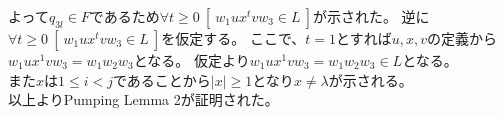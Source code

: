\documentclass[uplatex,dvipdfmx,a4paper,10pt]{jsarticle}
\begin{document}
        よって\(q_{3l} \in F\)であるため\(\forall t \geq 0\ [\ w_1ux^tvw_3 \in L\ ]\)が示された。
        逆に\(\forall t \geq 0\ [\ w_1ux^tvw_3 \in L\ ]\)を仮定する。
        ここで、\(t = 1\)とすれば\(u, x, v\)の定義から\(w_1ux^1vw_3 = w_1w_2w_3\)となる。
        仮定より\(w_1ux^1vw_3 = w_1w_2w_3 \in L\)となる。 \\
        \indent また\(x\)は\(1 \leq i < j\)であることから\(|x| \geq 1\)となり\(x \neq \lambda\)が示される。 \\
        \hspace{1em}以上よりPumping Lemma 2が証明された。

    
    
    \appendix
    \setcounter{figure}{0}
    \setcounter{table}{0}
    \renewcommand{\thetable}{\Alph{section}\arabic{table}}
    \renewcommand{\thefigure}{\Alph{section}\arabic{figure}}
    \makeatletter 
    \newcommand{\section@cntformat}{付録 \thesection:\ }
    \makeatother
    
    
\end{document}
